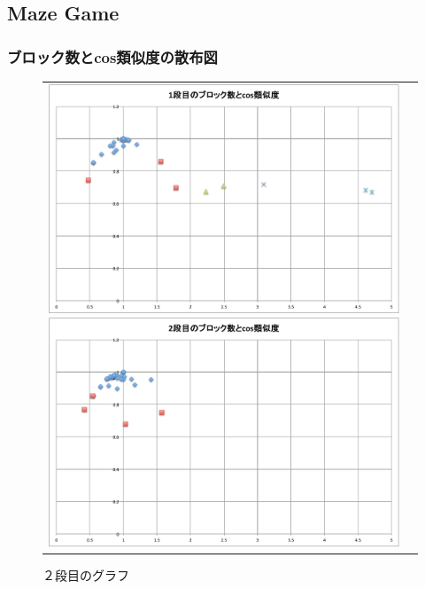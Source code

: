\documentclass[twocolumn,9pt,a4paper]{jsarticle}
\begin{document}
\newpage
\subsection{Maze Game}
\subsubsection{ブロック数とcos類似度の散布図}
\begin{figure}[h]
 \begin{tabular}{cc}
 	\begin{minipage}[t]{0.45\hsize}
	 \centering
	 \includegraphics[keepaspectratio, scale = 0.14]{mazegame_first_block.pdf}
	 \caption{１段目のグラフ}
	 \label{first_block}
	\end{minipage}
        \begin{minipage}[t]{0.45\hsize}
	 \centering
	 \includegraphics[keepaspectratio, scale = 0.14]{mazegame_second_block.pdf}
	 \caption{２段目のグラフ}
	 \label{second_block}
	\end{minipage}
 \end{tabular}
 \end{figure}
\end{document}
